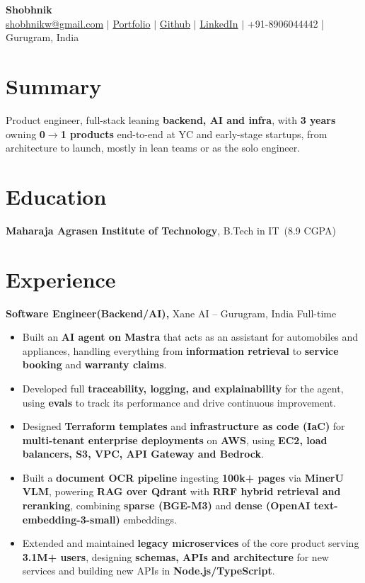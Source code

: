 \documentclass[10pt,a4paper]{article}
\newcommand{\resumeheader}[6]{%
    {\centering
        {\Large \textbf{#1}}\\[4pt]
        \href{mailto:#2}{#2} $|$ 
        \href{#3}{Portfolio} $|$ 
        \href{#4}{Github} $|$ 
        \href{#5}{LinkedIn} $|$ 
        #6\par}
}
\newcommand{\education}[4]{%
    \textbf{#1}, #2\ (#3) \hfill #4
}
\newcommand{\experience}[4]{%
    \textbf{#1,} #2 -- #3 \hfill #4
}
\begin{document}
\resumeheader{Shobhnik}
{shobhnikw@gmail.com}
{https://shobhnik.site}
{https://github.com/shobhnik13}
{https://www.linkedin.com/in/shobhnik13/}
{+91-8906044442 | Gurugram, India}

\section{Summary}
Product engineer, full-stack leaning \textbf{backend, AI and infra}, with \textbf{3 years} owning \textbf{0$\rightarrow$1 products} end-to-end at YC and early-stage startups, from architecture to launch, mostly in lean teams or as the solo engineer.

\section{Education}
\education{Maharaja Agrasen Institute of Technology}{B.Tech in IT}{8.9 CGPA}{}

\section{Experience}

\experience{Software Engineer(Backend/AI)}{Xane AI}{Gurugram, India}{Full-time}
\begin{itemize}[leftmargin=20pt]

\item Built an \textbf{AI agent on Mastra} that acts as an assistant for automobiles and appliances, handling everything from \textbf{information retrieval} to \textbf{service booking} and \textbf{warranty claims}.

\item Developed full \textbf{traceability, logging, and explainability} for the agent, using \textbf{evals} to track its performance and drive continuous improvement.

\item Designed \textbf{Terraform templates} and \textbf{infrastructure as code (IaC)} for \textbf{multi-tenant enterprise deployments} on \textbf{AWS}, using \textbf{EC2, load balancers, S3, VPC, API Gateway and Bedrock}.

\item Built a \textbf{document OCR pipeline} ingesting \textbf{100k+ pages} via \textbf{MinerU VLM}, powering \textbf{RAG over Qdrant} with \textbf{RRF hybrid retrieval and reranking}, combining \textbf{sparse (BGE-M3)} and \textbf{dense (OpenAI text-embedding-3-small)} embeddings.

\item Extended and maintained \textbf{legacy microservices} of the core product serving \textbf{3.1M+ users}, designing \textbf{schemas, APIs and architecture} for new services and building new APIs in \textbf{Node.js/TypeScript}.
\end{itemize}
\end{document}
